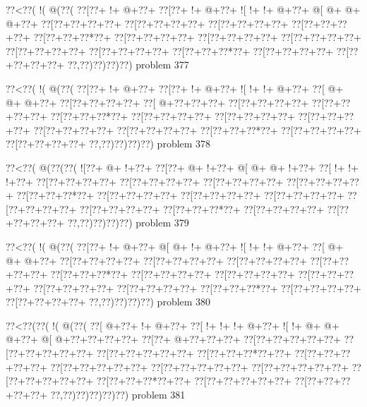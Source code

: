 \vbox{\vbox{\goo
\0??<\0??(\- !(\- @(\0??(
\0??[\0??+\- !+\- @+\0??+
\0??[\0??+\- !+\- @+\0??+
\- ![\- !+\- !+\- @+\0??+
\- @[\- @+\- @+\- @+\0??+
\0??[\0??+\0??+\0??+\0??+
\0??[\0??+\0??+\0??+\0??+
\0??[\0??+\0??+\0??+\0??+
\0??[\0??+\0??+\0??+\0??+
\0??[\0??+\0??+\0??*\0??+
\0??[\0??+\0??+\0??+\0??+
\0??[\0??+\0??+\0??+\0??+
\0??[\0??+\0??+\0??+\0??+
\0??[\0??+\0??+\0??+\0??+
\0??[\0??+\0??+\0??+\0??+
\0??[\0??+\0??+\0??*\0??+
\0??[\0??+\0??+\0??+\0??+
\0??[\0??+\0??+\0??+\0??+
\0??,\0??)\0??)\0??)\0??)
}
\hfil problem 377\hfil\break
}

\vbox{\vbox{\goo
\0??<\0??(\- !(\- @(\0??(
\0??[\0??+\- !+\- @+\0??+
\0??[\0??+\- !+\- @+\0??+
\- ![\- !+\- !+\- @+\0??+
\0??[\- @+\- @+\- @+\0??+
\0??[\0??+\0??+\0??+\0??+
\0??[\- @+\0??+\0??+\0??+
\0??[\0??+\0??+\0??+\0??+
\0??[\0??+\0??+\0??+\0??+
\0??[\0??+\0??+\0??*\0??+
\0??[\0??+\0??+\0??+\0??+
\0??[\0??+\0??+\0??+\0??+
\0??[\0??+\0??+\0??+\0??+
\0??[\0??+\0??+\0??+\0??+
\0??[\0??+\0??+\0??+\0??+
\0??[\0??+\0??+\0??*\0??+
\0??[\0??+\0??+\0??+\0??+
\0??[\0??+\0??+\0??+\0??+
\0??,\0??)\0??)\0??)\0??)
}
\hfil problem 378\hfil\break
}

\vbox{\vbox{\goo
\0??<\0??(\- @(\0??(\0??(
\- ![\0??+\- @+\- !+\0??+
\0??[\0??+\- @+\- !+\0??+
\- @[\- @+\- @+\- !+\0??+
\0??[\- !+\- !+\- !+\0??+
\0??[\0??+\0??+\0??+\0??+
\0??[\0??+\0??+\0??+\0??+
\0??[\0??+\0??+\0??+\0??+
\0??[\0??+\0??+\0??+\0??+
\0??[\0??+\0??+\0??*\0??+
\0??[\0??+\0??+\0??+\0??+
\0??[\0??+\0??+\0??+\0??+
\0??[\0??+\0??+\0??+\0??+
\0??[\0??+\0??+\0??+\0??+
\0??[\0??+\0??+\0??+\0??+
\0??[\0??+\0??+\0??*\0??+
\0??[\0??+\0??+\0??+\0??+
\0??[\0??+\0??+\0??+\0??+
\0??,\0??)\0??)\0??)\0??)
}
\hfil problem 379\hfil\break
}

\vbox{\vbox{\goo
\0??<\0??(\- !(\- @(\0??(
\0??[\0??+\- !+\- @+\0??+
\- @[\- @+\- !+\- @+\0??+
\- ![\- !+\- !+\- @+\0??+
\0??[\- @+\- @+\- @+\0??+
\0??[\0??+\0??+\0??+\0??+
\0??[\0??+\0??+\0??+\0??+
\0??[\0??+\0??+\0??+\0??+
\0??[\0??+\0??+\0??+\0??+
\0??[\0??+\0??+\0??*\0??+
\0??[\0??+\0??+\0??+\0??+
\0??[\0??+\0??+\0??+\0??+
\0??[\0??+\0??+\0??+\0??+
\0??[\0??+\0??+\0??+\0??+
\0??[\0??+\0??+\0??+\0??+
\0??[\0??+\0??+\0??*\0??+
\0??[\0??+\0??+\0??+\0??+
\0??[\0??+\0??+\0??+\0??+
\0??,\0??)\0??)\0??)\0??)
}
\hfil problem 380\hfil\break
}

\vbox{\vbox{\goo
\0??<\0??(\0??(\- !(\- @(\0??(
\0??[\- @+\0??+\- !+\- @+\0??+
\0??[\- !+\- !+\- !+\- @+\0??+
\- ![\- !+\- @+\- @+\- @+\0??+
\- @[\- @+\0??+\0??+\0??+\0??+
\0??[\0??+\- @+\0??+\0??+\0??+
\0??[\0??+\0??+\0??+\0??+\0??+
\0??[\0??+\0??+\0??+\0??+\0??+
\0??[\0??+\0??+\0??+\0??+\0??+
\0??[\0??+\0??+\0??*\0??+\0??+
\0??[\0??+\0??+\0??+\0??+\0??+
\0??[\0??+\0??+\0??+\0??+\0??+
\0??[\0??+\0??+\0??+\0??+\0??+
\0??[\0??+\0??+\0??+\0??+\0??+
\0??[\0??+\0??+\0??+\0??+\0??+
\0??[\0??+\0??+\0??*\0??+\0??+
\0??[\0??+\0??+\0??+\0??+\0??+
\0??[\0??+\0??+\0??+\0??+\0??+
\0??,\0??)\0??)\0??)\0??)\0??)
}
\hfil problem 381\hfil\break
}

